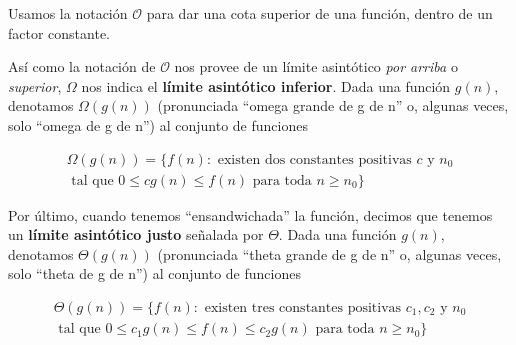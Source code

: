 Usamos la notaci\'on $\mathcal{O}$ para dar una cota superior de una funci\'on, dentro de un factor constante.

\begin{definition}

As\'i como la notaci\'on de $\mathcal{O}$ nos provee de un l\'imite asint\'otico \textit{por arriba} o \textit{superior}, $\Omega$ nos indica el \textbf{l\'imite asint\'otico inferior}. Dada una funci\'on $g(n)$, denotamos $\Omega(g(n))$ (pronunciada ``omega grande de g de n'' o, algunas veces, solo ``omega de g de n'') al conjunto de funciones

\begin{equation*}
\begin{split}
\Omega(g(n)) = \{f(n): \text{ existen dos constantes positivas } c \text{ y } n_0 \\ \text{ tal que } 0 \leq cg(n) \leq f(n) \text{ para toda } n \geq n_0\}
\end{split}
\end{equation*}
\end{definition}

\begin{definition}

Por \'ultimo, cuando tenemos ``ensandwichada'' la funci\'on, decimos que tenemos un \textbf{l\'imite asint\'otico justo} señalada por $\Theta$. Dada una funci\'on $g(n)$, denotamos $\Theta(g(n))$ (pronunciada ``theta grande de g de n'' o, algunas veces, solo ``theta de g de n'') al conjunto de funciones

\begin{equation*}
\begin{split}
\Theta(g(n)) = \{f(n): \text{ existen tres constantes positivas } c_1, c_2 \text{ y } n_0 \\
\text{ tal que } 0 \leq c_1g(n) \leq f(n) \leq c_2g(n) \text{ para toda } n \geq n_0\}
\end{split}
\end{equation*}
\end{definition}
